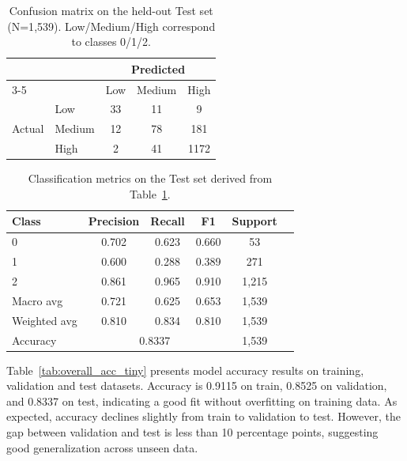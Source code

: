 \begin{table}[h!]
  \centering
  \caption{Confusion matrix on the held-out Test set (N=1{,}539). Low/Medium/High correspond to classes 0/1/2.}
  \small
  \begin{tabular}{llccc}
    \toprule
    & & \multicolumn{3}{c}{Predicted} \\
    \cmidrule(lr){3-5}
    & & Low & Medium & High \\
    \midrule
    \multirow{3}{*}{Actual} & Low    & 33 & 11 &  9 \\
                          & Medium & 12 & 78 & 181 \\
                          & High   &  2 & 41 & 1172 \\
    \bottomrule
  \end{tabular}
  \label{tab:rq_confmat_test}
\end{table}


\begin{table}[h!]
    \centering
    \small
    \caption{Classification metrics on the Test set derived from Table~\ref{tab:rq_confmat_test}.}
    \begin{tabular}{lccccr}
        \toprule
        Class & Precision & Recall & F1 & Support \\
        \midrule
        0 & 0.702 & 0.623 & 0.660 & 53 \\
        1 & 0.600 & 0.288 & 0.389 & 271 \\
        2 & 0.861 & 0.965 & 0.910 & 1{,}215 \\
        \midrule
        Macro avg   & 0.721 & 0.625 & 0.653 & 1{,}539 \\
        Weighted avg& 0.810 & 0.834 & 0.810 & 1{,}539 \\
        \midrule
        Accuracy    & \multicolumn{3}{c}{0.8337} & 1{,}539 \\
        \bottomrule
    \end{tabular}
    \label{tab:rq_cls_report_test}
\end{table}



Table~\ref{tab:overall_acc_tiny} presents model accuracy results on training, validation and test datasets. Accuracy is 0.9115 on train, 0.8525 on validation, and 0.8337 on test, indicating a good fit without overfitting on training data. As expected, accuracy declines slightly from train to validation to test. However, the gap between validation and test is less than 10 percentage points, suggesting good generalization across unseen data.

